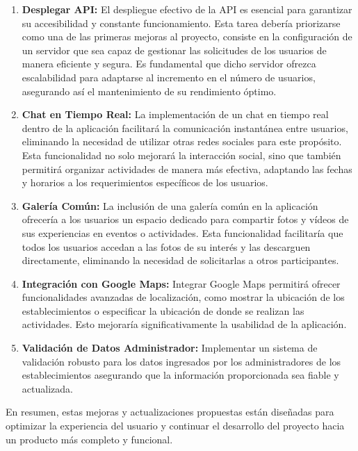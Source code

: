 \begin{enumerate}
    \item \textbf{Desplegar API: }El despliegue efectivo de la API es esencial para garantizar su accesibilidad y constante funcionamiento. Esta tarea debería priorizarse como una de las primeras mejoras al proyecto, consiste en la configuración de un servidor que sea capaz de gestionar las solicitudes de los usuarios de manera eficiente y segura. Es fundamental que dicho servidor ofrezca escalabilidad para adaptarse al incremento en el número de usuarios, asegurando así el mantenimiento de su rendimiento óptimo.
    \item \textbf{Chat en Tiempo Real: }La implementación de un chat en tiempo real dentro de la aplicación facilitará la comunicación instantánea entre usuarios, eliminando la necesidad de utilizar otras redes sociales para este propósito. Esta funcionalidad no solo mejorará la interacción social, sino que también permitirá organizar actividades de manera más efectiva, adaptando las fechas y horarios a los requerimientos específicos de los usuarios.
    \item \textbf{Galería Común: }La inclusión de una galería común en la aplicación ofrecería a los usuarios un espacio dedicado para compartir fotos y vídeos de sus experiencias en eventos o actividades. Esta funcionalidad facilitaría que todos los usuarios accedan a las fotos de su interés y las descarguen directamente, eliminando la necesidad de solicitarlas a otros participantes.
    \item \textbf{Integración con Google Maps: }Integrar Google Maps permitirá ofrecer funcionalidades avanzadas de localización, como mostrar la ubicación de los establecimientos o especificar la ubicación de donde se realizan las actividades. Esto mejoraría significativamente la usabilidad de la aplicación.
    \item \textbf{Validación de Datos Administrador: }Implementar un sistema de validación robusto para los datos ingresados por los administradores de los establecimientos asegurando que la información proporcionada sea fiable y actualizada.
\end{enumerate}

En resumen, estas mejoras y actualizaciones propuestas están diseñadas para optimizar la experiencia del usuario y continuar el desarrollo del proyecto hacia un producto más completo y funcional.